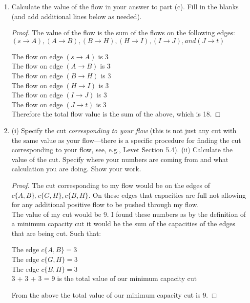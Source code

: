 \documentclass[11pt]{article}
\theoremstyle{definition}
\theoremstyle{definition}
\theoremstyle{definition}
\begin{document}
\begin{enumerate}
\begin{proof}[Answer]
\begin{comment}
	\path (H) edge node[ right] {$ 3 / 3$} (B);
	
	\end{tikzpicture}  
\end{center}
\end{comment}

\end{proof}

\vfill 
\newpage
\item Calculate the value of the flow in your answer to part (c). Fill in the blanks (and add additional lines below as needed).

\begin{proof}
The value of the flow is the sum of the flows on the following edges: $(s \to A), (A \to B), (B \to H), (H \to I), (I \to J), and (J \to t)$ %

The flow on edge $(s \to A)$ is 3 \\
The flow on edge $(A \to B)$ is 3 \\
The flow on edge $(B \to H)$ is 3 \\
The flow on edge $(H \to I)$ is 3 \\
The flow on edge $(I \to J)$ is 3 \\
The flow on edge $(J \to t)$ is 3 \\


Therefore the total flow value is the sum of the above, which is 18.
\end{proof}

\item (i) Specify the cut \emph{corresponding to your flow} (this is not just any cut with the same value as your flow---there is a specific procedure for finding the cut corresponding to your flow, see, e.g., Levet Section 5.4). (ii) Calculate the value of the cut. Specify where your numbers are coming from and what calculation you are doing. Show your work. 

\begin{proof}
The cut corresponding to my flow would be on the edges of $c\{A, B\}, c\{G, H\}, c\{B, H\}$. On these edges that capacities are full not allowing for any additional positive flow to be pushed through my flow. \\

The value of my cut would be 9. I found these numbers as by the definition of a minimum capacity cut it would be the sum of the capacities of the edges that are being cut. Such that: \\
\begin{center}
The edge $c\{A, B\} = 3$ \\
The edge $c\{G, H\} = 3$ \\
The edge $c\{B, H\} = 3$ \\
3 + 3 + 3 = 9 is the total value of our minimum capacity cut
\end{center}
From the above the total value of our minimum capacity cut is 9.
\vfill
\end{proof}

\end{enumerate}
\end{document}
